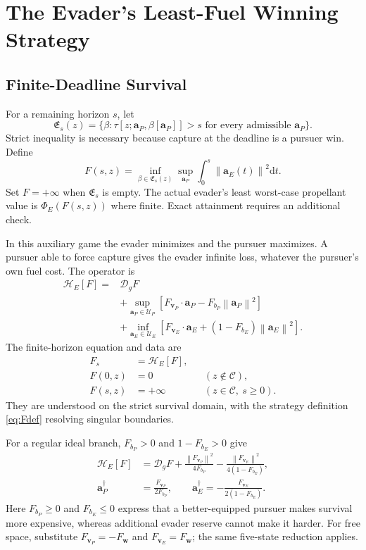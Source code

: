 \documentclass[journal,a4paper]{IEEEtran}
\newcommand{\C}{\mathcal C}
\newcommand{\U}{\mathcal U}
\newcommand{\D}{\mathcal D}
\newcommand{\HH}{\mathcal H}
\newcommand{\norm}[1]{\left\|#1\right\|}
\newcommand{\dd}{\mathrm d}
\begin{document}
\section{The Evader's Least-Fuel Winning Strategy}
\label{sec:escape}
\subsection{Finite-Deadline Survival}
For a remaining horizon $s$, let
\begin{equation}
 \mathfrak E_s(z)=
 \{\beta:\tau[z;\mathbf a_P,\beta[\mathbf a_P]]>s
                  \text{ for every admissible }\mathbf a_P\}.
 \label{eq:winningE}
\end{equation}
Strict inequality is necessary because capture at the deadline is a pursuer win. Define
\begin{equation}
 F(s,z)=\inf_{\beta\in\mathfrak E_s(z)}
       \sup_{\mathbf a_P}\int_0^s\norm{\mathbf a_E(t)}^2\dd t.
 \label{eq:Fdef}
\end{equation}
Set $F=+\infty$ when $\mathfrak E_s$ is empty. The actual evader's least worst-case propellant value is $\Phi_E(F(s,z))$ where finite. Exact attainment requires an additional check.

In this auxiliary game the evader minimizes and the pursuer maximizes. A pursuer able to force capture gives the evader infinite loss, whatever the pursuer's own fuel cost. The operator is
\begin{align}
 \HH_E[F]={}&\D_g F\nonumber\\
 &+\sup_{\mathbf a_P\in\U_P}
  [F_{\mathbf v_P}\cdot\mathbf a_P-F_{b_P}\norm{\mathbf a_P}^2]\nonumber\\
 &+\inf_{\mathbf a_E\in\U_E}
  [F_{\mathbf v_E}\cdot\mathbf a_E+(1-F_{b_E})\norm{\mathbf a_E}^2].
 \label{eq:HE}
\end{align}
The finite-horizon equation and data are
\begin{align}
 F_s&=\HH_E[F],\label{eq:FPDE}\\
 F(0,z)&=0 &&(z\notin\C),\nonumber\\
 F(s,z)&=+\infty &&(z\in\C,\ s\ge0).\label{eq:Fbc}
\end{align}
They are understood on the strict survival domain, with the strategy definition \eqref{eq:Fdef} resolving singular boundaries.

For a regular ideal branch, $F_{b_P}>0$ and $1-F_{b_E}>0$ give
\begin{align}
 \HH_E[F]&=\D_g F
  +\frac{\norm{F_{\mathbf v_P}}^2}{4F_{b_P}}
  -\frac{\norm{F_{\mathbf v_E}}^2}{4(1-F_{b_E})},\label{eq:HEquad}\\
 \mathbf a_P^{\dagger}&=\frac{F_{\mathbf v_P}}{2F_{b_P}},\qquad
 \mathbf a_E^{\dagger}=-\frac{F_{\mathbf v_E}}{2(1-F_{b_E})}.
 \label{eq:Efeedback}
\end{align}
Here $F_{b_P}\ge0$ and $F_{b_E}\le0$ express that a better-equipped pursuer makes survival more expensive, whereas additional evader reserve cannot make it harder. For free space, substitute $F_{\mathbf v_P}=-F_{\mathbf w}$ and $F_{\mathbf v_E}=F_{\mathbf w}$; the same five-state reduction applies.
\end{document}
